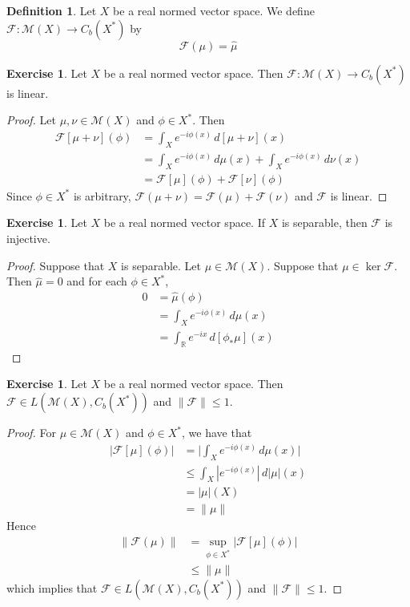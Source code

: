 \documentclass[12pt]{amsart}
\theoremstyle{definition}
\newtheorem{defn}[definition]{Definition}
\newtheorem{ex}[definition]{Exercise}
\newcommand{\R}{\mathbb{R}}
\newcommand{\MF}{\mathcal{F}}
\newcommand{\MM}{\mathcal{M}}
\newcommand{\dmu}{\, d \mu}
\newcommand{\dnu}{\, d \nu}
\begin{document}
	\begin{defn}
		Let $X$ be a real normed vector space. We define $\MF: \MM(X) \rightarrow C_b(X^*)$ by $$\MF(\mu) = \hat{\mu}$$
	\end{defn}
	
	\begin{ex}
		Let $X$ be a real normed vector space. Then $\MF: \MM(X) \rightarrow C_b(X^*)$ is linear.
	\end{ex}
	
	\begin{proof}
		Let $\mu, \nu \in \MM(X)$ and $\phi \in X^*$. Then 
		\begin{align*}
			\MF[\mu + \nu](\phi) 
			& = \int_X e^{-i \phi(x)} \, d[\mu + \nu](x) \\
			& = \int_X e^{-i \phi(x)} \dmu(x) + \int_X e^{-i \phi(x)} \dnu(x) \\
			& = \MF[\mu](\phi) + \MF[\nu](\phi) 
		\end{align*}
		Since $\phi \in X^*$ is arbitrary, $\MF(\mu + \nu) = \MF(\mu) + \MF(\nu)$ and $\MF$ is linear.
	\end{proof}
	
	\begin{ex}
		Let $X$ be a real normed vector space. If $X$ is separable, then $\MF$ is injective.  
	\end{ex}
	
	\begin{proof}
		Suppose that $X$ is separable. Let $\mu \in \MM(X)$. Suppose that $\mu \in \ker \MF$. Then $\hat{\mu} =0$ and for each $\phi \in X^*$, 
		\begin{align*}
			0 
			& = \hat{\mu}(\phi) \\
			& = \int_X e^{-i \phi(x)} \dmu(x) \\
			& = \int_{\R} e^{-ix} \, d[\phi_*\mu](x)
		\end{align*}
	\end{proof}
	
	\begin{ex}
		Let $X$ be a real normed vector space. Then $\MF \in L(\MM(X), C_b(X^*))$ and $\|\MF\| \leq 1$.
	\end{ex}
	
	\begin{proof}
		For $\mu \in \MM(X)$ and $\phi \in X^*$, we have that 
		\begin{align*}
			|\MF[\mu](\phi)|
			& =  \bigg| \int_X e^{-i \phi(x)} \dmu(x) \bigg| \\
			& \leq \int_X |e^{-i \phi(x)}| \, d|\mu|(x) \\
			& = |\mu|(X) \\
			& = \|\mu\|
		\end{align*}
		Hence 
		\begin{align*}
			\|\MF(\mu)\| 
			& = \sup_{\phi \in X^*} |\MF[\mu](\phi)| \\
			& \leq \|\mu\|
		\end{align*}
		which implies that $\MF \in L(\MM(X), C_b(X^*))$ and $\|\MF\| \leq 1$.
	\end{proof}
	
\end{document}
